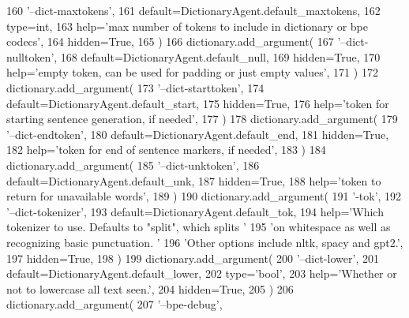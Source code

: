 \begin{DoxyCode}
160             \textcolor{stringliteral}{'--dict-maxtokens'},
161             default=DictionaryAgent.default\_maxtokens,
162             type=int,
163             help=\textcolor{stringliteral}{'max number of tokens to include in dictionary or bpe codecs'},
164             hidden=\textcolor{keyword}{True},
165         )
166         dictionary.add\_argument(
167             \textcolor{stringliteral}{'--dict-nulltoken'},
168             default=DictionaryAgent.default\_null,
169             hidden=\textcolor{keyword}{True},
170             help=\textcolor{stringliteral}{'empty token, can be used for padding or just empty values'},
171         )
172         dictionary.add\_argument(
173             \textcolor{stringliteral}{'--dict-starttoken'},
174             default=DictionaryAgent.default\_start,
175             hidden=\textcolor{keyword}{True},
176             help=\textcolor{stringliteral}{'token for starting sentence generation, if needed'},
177         )
178         dictionary.add\_argument(
179             \textcolor{stringliteral}{'--dict-endtoken'},
180             default=DictionaryAgent.default\_end,
181             hidden=\textcolor{keyword}{True},
182             help=\textcolor{stringliteral}{'token for end of sentence markers, if needed'},
183         )
184         dictionary.add\_argument(
185             \textcolor{stringliteral}{'--dict-unktoken'},
186             default=DictionaryAgent.default\_unk,
187             hidden=\textcolor{keyword}{True},
188             help=\textcolor{stringliteral}{'token to return for unavailable words'},
189         )
190         dictionary.add\_argument(
191             \textcolor{stringliteral}{'-tok'},
192             \textcolor{stringliteral}{'--dict-tokenizer'},
193             default=DictionaryAgent.default\_tok,
194             help=\textcolor{stringliteral}{'Which tokenizer to use. Defaults to "split", which splits '}
195             \textcolor{stringliteral}{'on whitespace as well as recognizing basic punctuation. '}
196             \textcolor{stringliteral}{'Other options include nltk, spacy and gpt2.'},
197             hidden=\textcolor{keyword}{True},
198         )
199         dictionary.add\_argument(
200             \textcolor{stringliteral}{'--dict-lower'},
201             default=DictionaryAgent.default\_lower,
202             type=\textcolor{stringliteral}{'bool'},
203             help=\textcolor{stringliteral}{'Whether or not to lowercase all text seen.'},
204             hidden=\textcolor{keyword}{True},
205         )
206         dictionary.add\_argument(
207             \textcolor{stringliteral}{'--bpe-debug'},

\end{DoxyCode}
